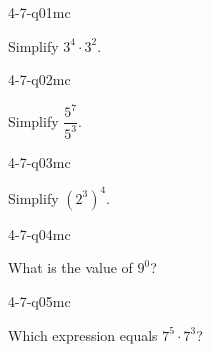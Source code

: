 

\begin{practiceQuestion}{4-7-q01}{mc}
\begin{questionText}
Simplify $3^4 \cdot 3^2$.
\end{questionText}
\end{practiceQuestion}

\begin{practiceQuestion}{4-7-q02}{mc}
\begin{questionText}
Simplify $\dfrac{5^7}{5^3}$.
\end{questionText}
\end{practiceQuestion}

\begin{practiceQuestion}{4-7-q03}{mc}
\begin{questionText}
Simplify $(2^3)^4$.
\end{questionText}
\end{practiceQuestion}

\begin{practiceQuestion}{4-7-q04}{mc}
\begin{questionText}
What is the value of $9^0$?
\end{questionText}
\end{practiceQuestion}

\begin{practiceQuestion}{4-7-q05}{mc}
\begin{questionText}
Which expression equals $7^5 \cdot 7^3$?
\end{questionText}
\end{practiceQuestion}

